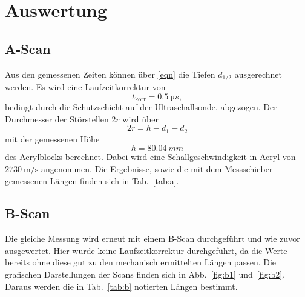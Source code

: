 \pagebreak
\section{Auswertung}
\label{sec:Auswertung}

\subsection{A-Scan}
Aus den gemessenen Zeiten können über \eqref{eqn} die Tiefen $d_{1/2}$ ausgerechnet werden. Es wird eine Laufzeitkorrektur von
\begin{equation}
  t_\text{korr} = \SI{0.5}{µs},
\end{equation}
bedingt durch die Schutzschicht auf der Ultraschallsonde, abgezogen. Der Durchmesser der Störstellen $2r$ wird über
\begin{equation}
  2r = h - d_1 - d_2
\end{equation} mit der gemessenen Höhe
\begin{equation}
  h = \SI{80.04}{mm}
\end{equation}
des Acrylblocks berechnet. Dabei wird eine Schallgeschwindigkeit in Acryl von $\SI{2730}{\meter\per\second}$ \cite{olympus} angenommen. Die Ergebnisse, sowie die mit dem Messschieber gemessenen Längen finden sich in Tab.~\ref{tab:a}.


\subsection{B-Scan}
Die gleiche Messung wird erneut mit einem B-Scan durchgeführt und wie zuvor ausgewertet. Hier wurde keine Laufzeitkorrektur durchgeführt, da die Werte bereits ohne diese gut zu den mechanisch ermittelten Längen passen. Die grafischen Darstellungen der Scans finden sich in Abb.~\ref{fig:b1} und~\ref{fig:b2}. Daraus werden die in Tab.~\ref{tab:b} notierten Längen bestimmt.
\FloatBarrier


